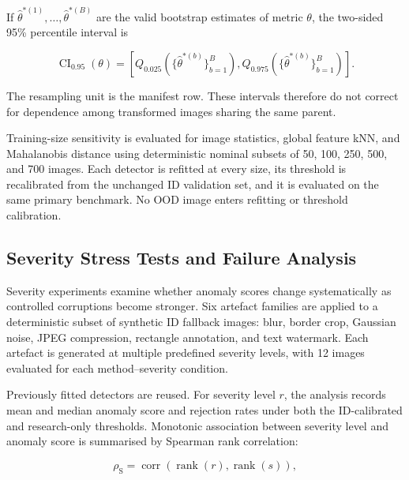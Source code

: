 \documentclass[fleqn,12pt]{olplainarticle}
\begin{document}
If $\widehat{\theta}^{*(1)},\ldots,\widehat{\theta}^{*(B)}$ are the valid
bootstrap estimates of metric $\theta$, the two-sided 95\% percentile interval
is

\begin{equation}
    \operatorname{CI}_{0.95}(\theta)
    =
    \left[
        Q_{0.025}
        \left(
            \{\widehat{\theta}^{*(b)}\}_{b=1}^{B}
        \right),
        Q_{0.975}
        \left(
            \{\widehat{\theta}^{*(b)}\}_{b=1}^{B}
        \right)
    \right].
    \label{eq:protocol_bootstrap_ci}
\end{equation}

The resampling unit is the manifest row. These intervals therefore do not
correct for dependence among transformed images sharing the same parent.

Training-size sensitivity is evaluated for image statistics, global feature
kNN, and Mahalanobis distance using deterministic nominal subsets of
50, 100, 250, 500, and 700 images. Each detector is refitted at every size,
its threshold is recalibrated from the unchanged ID validation set, and it is
evaluated on the same primary benchmark. No OOD image enters refitting or
threshold calibration.

\subsection{Severity Stress Tests and Failure Analysis}
\label{subsec:robustness_failure_protocol}

Severity experiments examine whether anomaly scores change systematically as
controlled corruptions become stronger. Six artefact families are applied to
a deterministic subset of synthetic ID fallback images: blur, border crop,
Gaussian noise, JPEG compression, rectangle annotation, and text watermark.
Each artefact is generated at multiple predefined severity levels, with 12
images evaluated for each method--severity condition.

Previously fitted detectors are reused. For severity level $r$, the analysis
records mean and median anomaly score and rejection rates under both the
ID-calibrated and research-only thresholds. Monotonic association between
severity level and anomaly score is summarised by Spearman rank correlation:

\begin{equation}
    \rho_{\mathrm{S}}
    =
    \operatorname{corr}
    \left(
        \operatorname{rank}(r),
        \operatorname{rank}(s)
    \right),
    \label{eq:protocol_spearman}
\end{equation}
\end{document}
